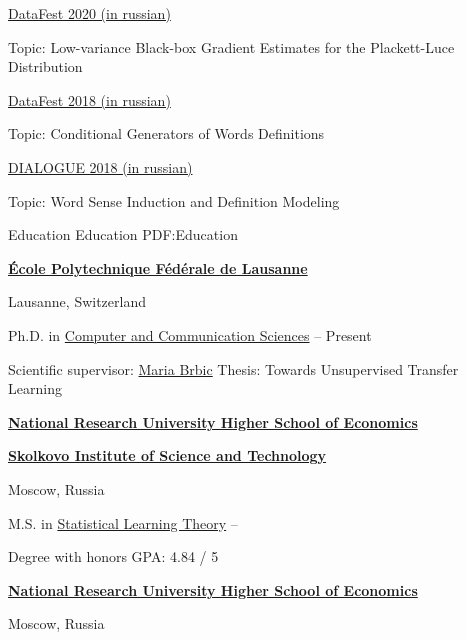 \documentclass[letterpaper,MMMyyyy,nonstopmode]{simpleresumecv}
\begin{document}
\begin{Body}
\Item
\href{http://datafest.ru}{DataFest 2020 (in russian)}
\hfill
{}
\begin{Detail}
\Item
Topic: Low-variance Black-box Gradient Estimates for the Plackett-Luce Distribution
\end{Detail}

\Item
\href{http://datafest.ru}{DataFest 2018 (in russian)}
\hfill
{}
\begin{Detail}
\Item
Topic: Conditional Generators of Words Definitions
\end{Detail}

\Gap
\Item
\href{http://www.dialog-21.ru/en/}{DIALOGUE 2018 (in russian)}
\hfill
{}
\begin{Detail}
\Item
Topic: Word Sense Induction and Definition Modeling
\end{Detail}




\Section
{Education}
{Education}
{PDF:Education}

\Entry
\href{https://www.epfl.ch/}
{\textbf{École Polytechnique Fédérale de Lausanne}}
\par
Lausanne, Switzerland

\Gap
\BulletItem
Ph.D. in
\href{https://www.epfl.ch/schools/ic/}
{Computer and Communication Sciences}
\hfill
{} --
Present
\begin{Detail}
\SubBulletItem
Scientific supervisor: \href{https://people.epfl.ch/maria.brbic?lang=en}{Maria Brbic}
\SubBulletItem
Thesis: Towards Unsupervised Transfer Learning
\end{Detail}
\Gap

\Entry
\href{https://www.hse.ru/en/}
{\textbf{National Research University Higher School of Economics}}
\par
\href{https://www.skoltech.ru/en/}{\textbf{Skolkovo Institute of Science and Technology}}
\par
Moscow, Russia

\Gap
\BulletItem
M.S. in
\href{https://www.hse.ru/en/ma/sltheory/}
{Statistical Learning Theory}
\hfill
{} --
\begin{Detail}
\SubBulletItem
Degree with honors
\SubBulletItem
GPA: 4.84 / 5
\end{Detail}
\Gap

\Entry
\href{https://www.hse.ru/en/}
{\textbf{National Research University Higher School of Economics}}
\par
Moscow, Russia


\end{Body}
\end{document}
